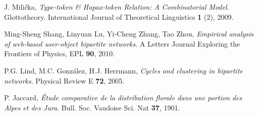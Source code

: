 \begin{thebibliography}{99}
  J. Milička,
  \emph{Type-token \& Hapax-token Relation: A Combinatorial Model}.
  Glottotheory. International Journal of Theoretical Linguistics \textbf{1} (2),
  2009.

  Ming-Sheng Shang, Linyuan Lu, Yi-Cheng Zhang, Tao Zhou,
  \emph{Empirical analysis of web-based user-object bipartite networks}.
  A Letters Journal Exploring the Frontiers of Physics, EPL \textbf{90},
  2010.

  P.G. Lind, M.C. González, H.J. Herrmann,
  \emph{Cycles and clustering in bipartite networks}.
  Physical Review E \textbf{72},
  2005.

  P. Jaccard,
  \emph{Étude comparative de la distribution florale dans une portion des Alpes et des Jura}.
  Bull. Soc. Vaudoise Sci. Nat \textbf{37},
  1901.
  

\end{thebibliography}
